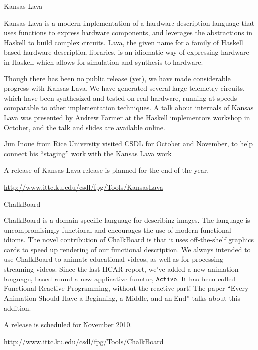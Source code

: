 \documentclass{article}
\begin{document}
\begin{hcarentry}{Kansas Lava}
\makeheader

Kansas Lava is a modern implementation of a hardware description language
that uses functions to express hardware components,
and leverages the abstractions in Haskell to build complex circuits. 
Lava, 
the given name for a family of Haskell based hardware description libraries,
is an idiomatic way of expressing hardware in Haskell which allows for simulation and
synthesis to hardware.

Though there has been no public release (yet), we have made considerable
progress with Kansas Lava. We have generated several large telemetry circuits,
which have been synthesized and tested on real hardware, running at speeds
comparable to other implementation techniques.
A talk about internals of Kansas Lava was presented by Andrew Farmer at the
Haskell implementors workshop in October, and the talk and slides are available online.

Jun Inoue from Rice University visited CSDL for October and November, to help
connect his ``staging'' work with the Kansas Lava work.

A release of Kansas Lava release is planned for the end of the year.

\FurtherReading
  \url{http://www.ittc.ku.edu/csdl/fpg/Tools/KansasLava}

\end{hcarentry}

\begin{hcarentry}{ChalkBoard}
\makeheader

ChalkBoard is a domain specific language for describing images. 
The language is uncompromisingly functional
and encourages the use of modern functional idioms.
The novel contribution of ChalkBoard is that it uses off-the-shelf
graphics cards to speed up rendering of our functional description.
We always intended to use ChalkBoard to animate educational
videos, as well as for processing streaming videos.
Since the last HCAR report, we've added a new animation language, based round a new applicative
functor, \verb|Active|. It has been called Functional Reactive Programming,
without the reactive part! The paper
``Every Animation Should Have a Beginning, a Middle, and an End'' talks
about this addition. 

A release is scheduled for November 2010.

\FurtherReading
  \url{http://www.ittc.ku.edu/csdl/fpg/Tools/ChalkBoard}

\end{hcarentry}
\end{document}

